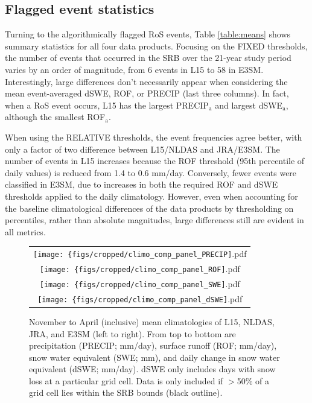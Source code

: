\documentclass[nhess, manuscript]{copernicus}
\begin{document}
\subsection{Flagged event statistics}

Turning to the algorithmically flagged RoS events, Table \ref{table:means} shows summary statistics for all four data products.
Focusing on the FIXED thresholds, the number of events that occurred in the SRB over the 21-year study period varies by an order of magnitude, from 6 events in L15 to 58 in E3SM.
Interestingly, large differences don't necessarily appear when considering the mean event-averaged dSWE, ROF, or PRECIP (last three columns).
In fact, when a RoS event occurs, L15 has the largest PRECIP$_\textrm{a}$ and largest dSWE$_\textrm{a}$, although the smallest ROF$_\textrm{a}$.

When using the RELATIVE thresholds, the event frequencies agree better, with only a factor of two difference between L15/NLDAS and JRA/E3SM.
The number of events in L15 increases because the ROF threshold (95th percentile of daily values) is reduced from 1.4 to 0.6 mm/day.
Conversely, fewer events were classified in E3SM, due to increases in both the required ROF and dSWE thresholds applied to the daily climatology.
However, even when accounting for the baseline climatological differences of the data products by thresholding on percentiles, rather than absolute magnitudes, large differences still are evident in all metrics.

\begin{figure}
\begin{tabular}{c}
\texttt{[image: \{figs/cropped/climo\_comp\_panel\_PRECIP]}.pdf} \\
\texttt{[image: \{figs/cropped/climo\_comp\_panel\_ROF]}.pdf} \\
\texttt{[image: \{figs/cropped/climo\_comp\_panel\_SWE]}.pdf} \\
\texttt{[image: \{figs/cropped/climo\_comp\_panel\_dSWE]}.pdf}
\end{tabular}
\caption{November to April (inclusive) mean climatologies of L15, NLDAS, JRA, and E3SM (left to right). From top to bottom are precipitation (PRECIP; mm/day), surface runoff (ROF; mm/day), snow water equivalent (SWE; mm), and daily change in snow water equivalent (dSWE; mm/day). dSWE only includes days with snow loss at a particular grid cell. Data is only included if $>$50\% of a grid cell lies within the SRB bounds (black outline).}
\label{fig:means}
\end{figure}
\end{document}

